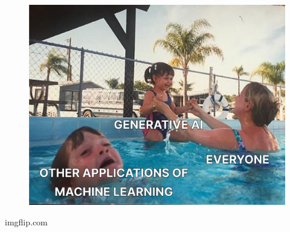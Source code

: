 \begin{frame}[t,fragile]
{\begin{minipage}[b]{\textwidth}
\begin{minipage}[b]{0.33\textwidth}
\begin{figure}[ht]
                \includegraphics[width=\textwidth]{img/meme-3-cut.jpeg}
            \end{figure}
            \begin{flushright}
                \vspace*{-7pt}
                {\tiny\textcopyright imgflip.com}
            \end{flushright}
        \end{minipage}
        \begin{minipage}[b]{0.33\textwidth}
            \centering
            \begin{figure}[ht]

\end{figure}
\end{minipage}
\end{minipage}}
\end{frame}
